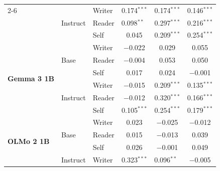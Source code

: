 \begin{table}[htbp]
\begin{tabular}{lll ccc}
\cmidrule(lr){2-6}
                                 & \multirow{3}{*}{Instruct} & Writer     & 0.174$^{***}$            & 0.174$^{***}$            & 0.146$^{***}$            \\
                                 &                          & Reader     & 0.098$^{**}\phantom{^{*}}$ & 0.297$^{***}$            & 0.216$^{***}$            \\
                                 &                          & Self       & 0.045\phantom{$^{***}$}  & 0.209$^{***}$            & 0.254$^{***}$            \\
\midrule
\multirow{6}{*}{\textbf{Gemma 3 1B}} & \multirow{3}{*}{Base}    & Writer     & $-$0.022\phantom{$^{***}$} & 0.029\phantom{$^{***}$}  & 0.055\phantom{$^{***}$}  \\
                                 &                          & Reader     & $-$0.004\phantom{$^{***}$} & 0.053\phantom{$^{***}$}  & 0.050\phantom{$^{***}$}  \\
                                 &                          & Self       & 0.017\phantom{$^{***}$}  & 0.024\phantom{$^{***}$}  & $-$0.001\phantom{$^{***}$} \\
\cmidrule(lr){2-6}
                                 & \multirow{3}{*}{Instruct} & Writer     & $-$0.015\phantom{$^{***}$} & 0.209$^{***}$            & 0.135$^{***}$            \\
                                 &                          & Reader     & $-$0.012\phantom{$^{***}$} & 0.320$^{***}$            & 0.166$^{***}$            \\
                                 &                          & Self       & 0.105$^{***}$            & 0.254$^{***}$            & 0.179$^{***}$            \\
\midrule
\multirow{6}{*}{\textbf{OLMo 2 1B}} & \multirow{3}{*}{Base}    & Writer     & 0.023\phantom{$^{***}$}  & $-$0.025\phantom{$^{***}$} & $-$0.012\phantom{$^{***}$} \\
                                 &                          & Reader     & 0.015\phantom{$^{***}$}  & $-$0.013\phantom{$^{***}$} & 0.039\phantom{$^{***}$}  \\
                                 &                          & Self       & 0.026\phantom{$^{***}$}  & $-$0.001\phantom{$^{***}$} & 0.049\phantom{$^{***}$}  \\
\cmidrule(lr){2-6}
                                 & \multirow{3}{*}{Instruct} & Writer     & 0.323$^{***}$            & 0.096$^{**}\phantom{^{*}}$ & $-$0.005\phantom{$^{***}$} \\

\end{tabular}
\end{table}
